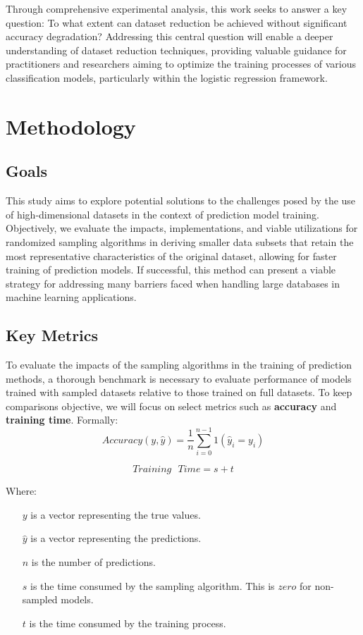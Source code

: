 \documentclass{article}
\theoremstyle{plain}
\theoremstyle{definition}
\theoremstyle{remark}
\begin{document}
Through comprehensive experimental analysis, this work seeks to answer a key question: To what extent can dataset reduction be achieved without significant accuracy degradation? Addressing this central question will enable a deeper understanding of dataset reduction techniques, providing valuable guidance for practitioners and researchers aiming to optimize the training processes of various classification models, particularly within the logistic regression framework.


\section{Methodology}

\subsection{Goals}

This study aims to explore potential solutions to the challenges posed by the use of high-dimensional datasets in the context of prediction model training. Objectively, we evaluate the impacts, implementations, and viable utilizations for randomized sampling algorithms in deriving smaller data subsets that retain the most representative characteristics of the original dataset, allowing for faster training of prediction models. If successful, this method can present a viable strategy for addressing many barriers faced when handling large databases in machine learning applications.


\subsection{Key Metrics}

To evaluate the impacts of the sampling algorithms in the training of prediction methods, a thorough benchmark is necessary to evaluate performance of models trained with sampled datasets relative to those trained on full datasets. To keep comparisons objective, we will focus on select metrics such as \textbf{accuracy} and \textbf{training time}. Formally:
$$
Accuracy(y, \hat{y}) = \frac{1}{n} \sum_{i=0}^{n-1} 1(\hat{y}_i = y_i)
$$

$$
Training\text{ }Time = s + t
$$

Where:

\begin{itemize}
	
	\item[$y$] is a vector representing the true values.
	\item[$\hat{y}$] is a vector representing the predictions.
	\item[$n$] is the number of predictions.
	\item[$s$] is the time consumed by the sampling algorithm. This is $zero$ for non-sampled models.
	\item[$t$] is the time consumed by the training process.
	
	
\end{itemize}
\end{document}
